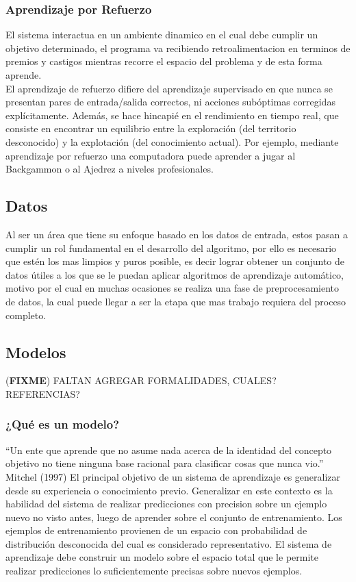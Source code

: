 \documentclass[a4paper,11pt,spanish]{book}
\newcommand*{\FIXME}[1]{{(\textbf{FIXME}) {#1}}}
\begin{document}
      \subsubsection{Aprendizaje por Refuerzo}
	El sistema interactua en un ambiente dinamico en el cual debe cumplir un objetivo determinado, el programa va recibiendo retroalimentacion en terminos de premios y castigos mientras 
	recorre el espacio del problema y de esta forma aprende.\\
	El aprendizaje de refuerzo difiere del aprendizaje supervisado en que nunca se presentan pares de entrada/salida correctos, ni acciones subóptimas corregidas explícitamente. 
	Además, se hace hincapié en el rendimiento en tiempo real, que consiste en encontrar un equilibrio entre la exploración (del territorio desconocido) y la explotación 
	(del conocimiento actual).
	Por ejemplo, mediante aprendizaje por refuerzo una computadora puede aprender a jugar al Backgammon o al Ajedrez a niveles profesionales.

    \subsection{Datos}
      Al ser un área que tiene su enfoque basado en los datos de entrada, estos pasan a cumplir un rol fundamental en el desarrollo del algoritmo, por ello es necesario que 
      estén los mas limpios y puros posible, es decir lograr obtener un conjunto de datos útiles a los que se le puedan aplicar algoritmos de aprendizaje automático, 
      motivo por el cual en muchas ocasiones se realiza una fase de preprocesamiento de datos, la cual puede llegar a ser la etapa que mas trabajo requiera del proceso completo. 

    \subsection{Modelos}
      \FIXME{FALTAN AGREGAR FORMALIDADES, CUALES? REFERENCIAS?}
      \subsubsection{¿Qué es un modelo?}
	“Un ente que aprende que no asume nada acerca de la identidad del concepto objetivo no tiene ninguna base racional para clasificar cosas que nunca vio.”
	Mitchel (1997)
	El principal objetivo de un sistema de aprendizaje es generalizar desde su experiencia o conocimiento previo. Generalizar en este contexto es la habilidad del sistema de realizar
	predicciones con precision sobre un ejemplo nuevo no visto antes, luego de aprender sobre el conjunto de entrenamiento. Los ejemplos de entrenamiento provienen de un espacio 
	con probabilidad de distribución desconocida del cual es considerado representativo. El sistema de aprendizaje debe construir un modelo sobre el espacio total que le permite realizar
	predicciones lo suficientemente precisas sobre nuevos ejemplos. 
	
\end{document}
